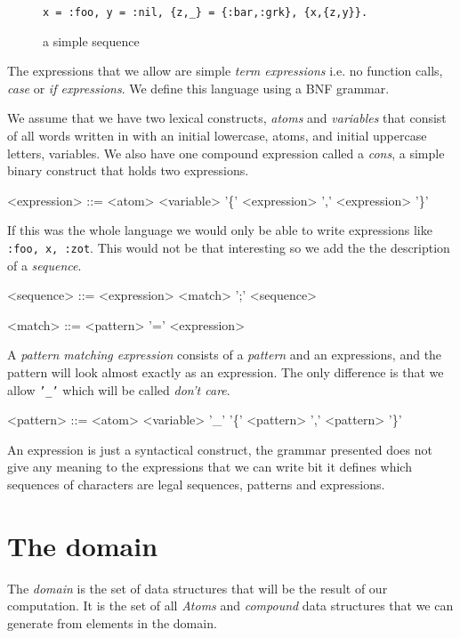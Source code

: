 \documentclass[a4paper,11pt]{article}
\begin{document}
\begin{figure}[ht]
\center
{\tt x = :foo, y = :nil, \{z,_\} = \{:bar,:grk\}, \{x,\{z,y\}\}.}
\caption{a simple sequence}
\label{fig:seq1}
\end{figure}

The expressions that we allow are simple {\em term expressions}
i.e. no function calls, {\em case} or {\em if expressions}. We define
this language using a BNF grammar.

We assume that we have two lexical constructs, {\em atoms} and {\em
  variables} that consist of all words written in with an initial
lowercase, atoms, and initial uppercase letters, variables.  We also
have one compound expression called a {\em cons}, a simple binary
construct that holds two expressions.

\begin{grammar}
<expression> ::= <atom> \alt <variable> \alt '\{' <expression> ',' <expression> '\}'
\end{grammar}

If this was the whole language we would only be able to write
expressions like {\tt {:foo, {x, :zot}}}. This would not be that
interesting so we add the the description of a {\em sequence}.

\begin{grammar}
<sequence> ::= <expression> \alt <match> ';' <sequence>

<match> ::= <pattern> '=' <expression> 
\end{grammar}


A {\em pattern matching expression} consists of a {\em pattern} and an
expressions, and the pattern will look almost exactly as an
expression. The only difference is that we allow {\tt '_'} which will
be called {\em don't care}.

\begin{grammar}
<pattern> ::= <atom>
\alt <variable>
\alt '_'  
\alt '\{' <pattern> ',' <pattern> '\}' 
\end{grammar}

An expression is just a syntactical construct, the grammar presented
does not give any meaning to the expressions that we can write bit it
defines which sequences of characters are legal sequences, patterns
and expressions.

\section{The domain}

The {\em domain} is the set of data structures that will be the result
of our computation. It is the set of all {\em Atoms} and {\em
  compound} data structures that we can generate from elements in the
domain.
\end{document}

